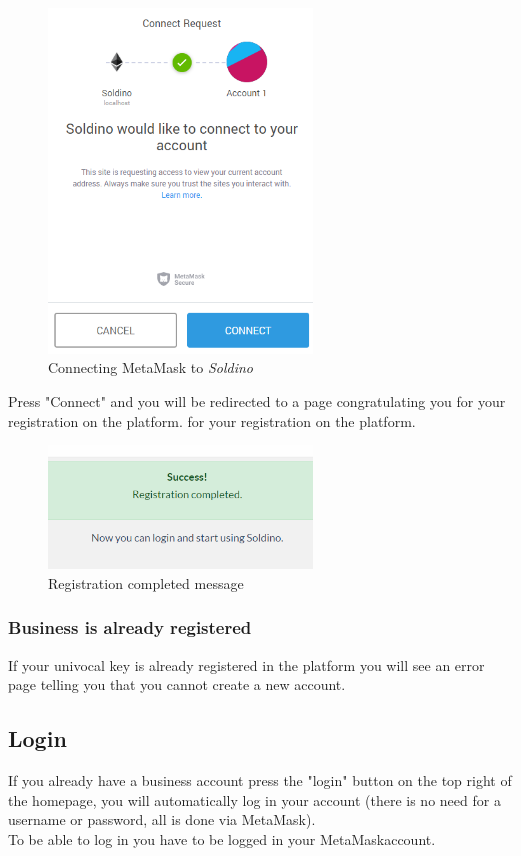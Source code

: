 	\begin{figure}[H]
		\includegraphics[width=7cm]{res/images/metamask_connect.png}
		\centering
		\caption{Connecting MetaMask to \textit{Soldino}}
	\end{figure}
	\noindent \noindent Press "Connect" and you will be redirected to a page 
	congratulating you for your registration on the platform.
	for your registration on the platform.
	\begin{figure}[H]
		\includegraphics[width=7cm]{res/images/registration_complete.png}
		\centering
		\caption{Registration completed message}
	\end{figure}
		\subsubsection{Business is already registered}
		If your univocal key is already registered in the platform you will 
		see an error page telling you that you cannot create a new account.
	\subsection{Login}
	If you already have a business account press the "login" button on the 
	top right of the homepage, you will automatically log in your account 
	(there is no need for a username or password, all is done via MetaMask). 
	\\To be able to log in you have to be logged in your MetaMask\glosp account.

